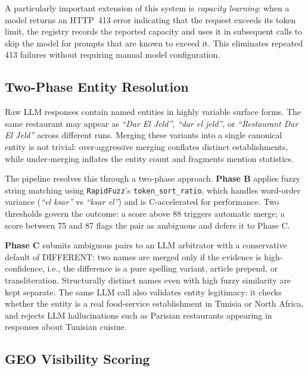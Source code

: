 A particularly important extension of this system is \textit{capacity learning}: when
a model returns an HTTP~413 error indicating that the request exceeds its token limit,
the registry records the reported capacity and uses it in subsequent calls to skip the
model for prompts that are known to exceed it. This eliminates repeated 413 failures
without requiring manual model configuration.

\subsection{Two-Phase Entity Resolution}

Raw LLM responses contain named entities in highly variable surface forms. The same
restaurant may appear as \textit{``Dar El Jeld''}, \textit{``dar el jeld''}, or
\textit{``Restaurant Dar El Jeld''} across different runs. Merging these variants into
a single canonical entity is not trivial: over-aggressive merging conflates distinct
establishments, while under-merging inflates the entity count and fragments mention
statistics.

The pipeline resolves this through a two-phase approach. \textbf{Phase B} applies
fuzzy string matching using \texttt{RapidFuzz}'s \texttt{token\_sort\_ratio}, which
handles word-order variance (\textit{``el ksar''} vs \textit{``ksar el''}) and is
C-accelerated for performance. Two thresholds govern the outcome:
a score above 88 triggers automatic merge; a score between 75 and 87 flags the pair
as ambiguous and defers it to Phase C.

\textbf{Phase C} submits ambiguous pairs to an LLM arbitrator with a conservative
default of DIFFERENT: two names are merged only if the evidence is high-confidence,
i.e., the difference is a pure spelling variant, article prepend, or transliteration.
Structurally distinct names even with high fuzzy similarity are kept separate.
The same LLM call also validates entity legitimacy: it checks whether the entity is
a real food-service establishment in Tunisia or North Africa, and rejects LLM
hallucinations such as Parisian restaurants appearing in responses about Tunisian
cuisine.

\subsection{GEO Visibility Scoring}

